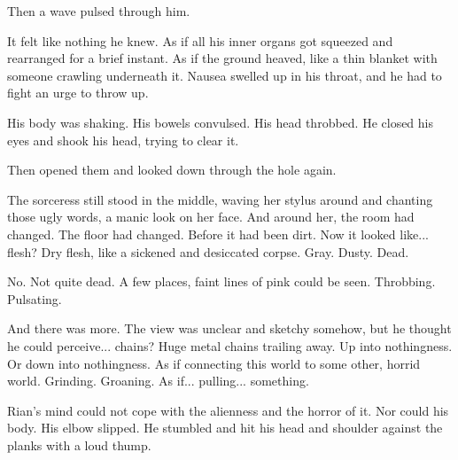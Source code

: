 Then a wave pulsed through him. 

It felt like nothing he knew. 
As if all his inner organs got squeezed and rearranged for a brief instant. 
As if the ground heaved, like a thin blanket with someone crawling underneath it. 
Nausea swelled up in his throat, and he had to fight an urge to throw up. 


His body was shaking. 
His bowels convulsed. 
His head throbbed. 
He closed his eyes and shook his head, trying to clear it. 

Then opened them and looked down through the hole again.


The sorceress still stood in the middle, waving her stylus around and chanting those ugly words, a manic look on her face. 
And around her, the room had changed. 
The floor had changed. 
Before it had been dirt. 
Now it looked like... flesh? 
Dry flesh, like a sickened and desiccated corpse. 
Gray. 
Dusty. 
Dead. 

No. 
Not quite dead. 
A few places, faint lines of pink could be seen. 
Throbbing. 
Pulsating. 

And there was more. 
The view was unclear and sketchy somehow, but he thought he could perceive... chains? 
Huge metal chains trailing away. 
Up into nothingness. 
Or down into nothingness. 
As if connecting this world to some other, horrid world. 
Grinding. 
Groaning.
As if... pulling... something. 


\begin{comment}
\subsection{Discovery and flight}
\end{comment}

Rian's mind could not cope with the alienness and the horror of it.
Nor could his body. 
His elbow slipped. 
He stumbled and hit his head and shoulder against the planks with a loud thump. 

